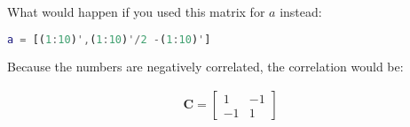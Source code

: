 What would happen if you used this matrix for $a$ instead:

\begin{lstlisting}[language=Matlab]
a = [(1:10)',(1:10)'/2 -(1:10)']
\end{lstlisting}

\begin{solution}
    Because the numbers are negatively correlated, the correlation would be:
    
    \begin{align*}
        \boldsymbol{C} = \begin{bmatrix}
            1 & -1 \\
            -1 & 1
        \end{bmatrix}
    \end{align*}
\end{solution}